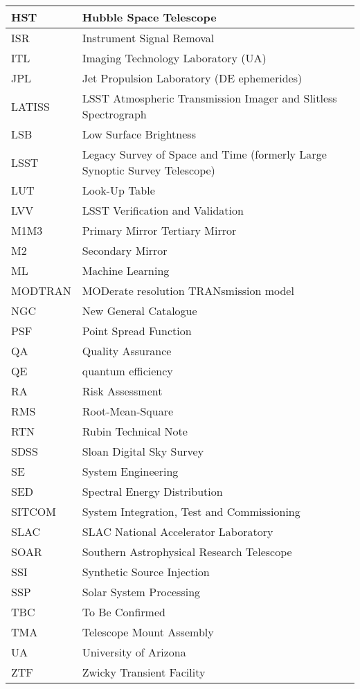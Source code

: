 \begin{longtable}{p{}p{}}
HST & Hubble Space Telescope \\\hline
ISR & Instrument Signal Removal \\\hline
ITL & Imaging Technology Laboratory (UA) \\\hline
JPL & Jet Propulsion Laboratory (DE ephemerides) \\\hline
LATISS & LSST Atmospheric Transmission Imager and Slitless Spectrograph \\\hline
LSB & Low Surface Brightness \\\hline
LSST & Legacy Survey of Space and Time (formerly Large Synoptic Survey Telescope) \\\hline
LUT & Look-Up Table \\\hline
LVV & LSST Verification and Validation \\\hline
M1M3 & Primary Mirror Tertiary Mirror \\\hline
M2 & Secondary Mirror \\\hline
ML & Machine Learning \\\hline
MODTRAN & MODerate resolution TRANsmission model \\\hline
NGC & New General Catalogue \\\hline
PSF & Point Spread Function \\\hline
QA & Quality Assurance \\\hline
QE & quantum efficiency \\\hline
RA & Risk Assessment \\\hline
RMS & Root-Mean-Square \\\hline
RTN & Rubin Technical Note \\\hline
SDSS & Sloan Digital Sky Survey \\\hline
SE & System Engineering \\\hline
SED & Spectral Energy Distribution \\\hline
SITCOM & System Integration, Test and Commissioning \\\hline
SLAC & SLAC National Accelerator Laboratory \\\hline
SOAR & Southern Astrophysical Research Telescope \\\hline
SSI & Synthetic Source Injection \\\hline
SSP & Solar System Processing \\\hline
TBC & To Be Confirmed \\\hline
TMA & Telescope Mount Assembly \\\hline
UA & University of Arizona \\\hline
ZTF & Zwicky Transient Facility \\\hline
\end{longtable}
